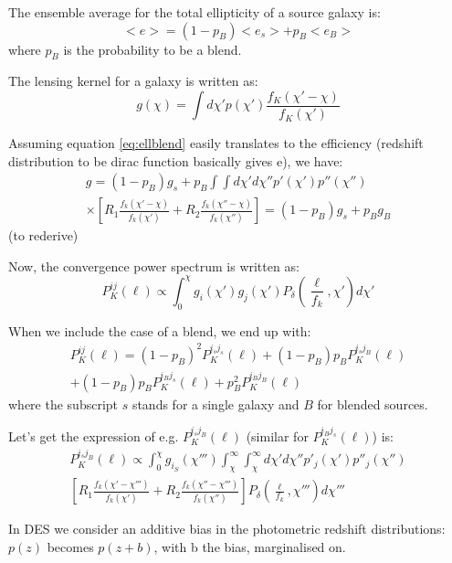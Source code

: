 \documentclass[prd,amsmath,aps,floats,amssymb, floatfix, superscriptaddress,nofootinbib,preprintnumbers,twocolumn]{article}  %
\begin{document}
The ensemble average for the total ellipticity of a source galaxy is: 
\begin{equation}
<e> = (1 - p_B) <e_s> + p_B <e_B> 
\end{equation}
where $p_B$ is the probability to be a blend. 

The lensing kernel for a galaxy is written as: 
\begin{equation}
g(\chi) = \int d\chi' p(\chi') \frac{f_K(\chi' - \chi)}{f_K(\chi')}
\end{equation}

Assuming equation \ref{eq:ellblend} easily translates to the efficiency (redshift distribution to be dirac function basically gives e), we have: 
\begin{multline}
g = (1 - p_B) g_s + p_B  \int \int d\chi' d\chi'' p'(\chi')p''(\chi'')  \\
\times [ R_1  \frac{f_k (\chi' - \chi)}{f_k (\chi')} 
+ R_2 \frac{f_k (\chi'' - \chi)}{f_k (\chi'')}   ] 
= (1 - p_B) g_s + p_B g_B
\end{multline}
(to rederive)

Now, the convergence power spectrum is written as:
\begin{equation}
P_K^{ij}(\ell) \propto \int_0^{\chi} g_i(\chi') g_j(\chi') P_{\delta} (\frac{\ell}{f_k},\chi') d\chi'
\end{equation}

When we include the case of a blend, we end up with: 
\begin{multline}
P_K^{ij}(\ell) =  (1 - p_B)^2 P_{K}^{i_s j_s}(\ell)  + (1 - p_B) p_B  P_{K}^{i_s j_B}(\ell) \\
+ (1 - p_B) p_B  P_{K}^{i_B j_s}(\ell) + p_B ^2 P_{K}^{i_B j_B}(\ell) 
\end{multline}
where the subscript $s$ stands for a single galaxy and $B$ for blended sources. 

Let's get the expression of e.g. $P_{K}^{i_s j_B}(\ell)$ (similar for $P_{K}^{i_B j_s}(\ell)$) is:
\begin{multline}
P_K^{i_sj_B}(\ell) \propto \int_0^{\chi} g_{i_S}(\chi''') \int_{\chi}^{\infty} \int_{\chi}^{\infty} d\chi' d\chi'' p'_j(\chi')p''_j(\chi'')  \\
[ R_1  \frac{f_k (\chi' - \chi''')}{f_k (\chi')} 
+ R_2 \frac{f_k (\chi'' - \chi''')}{f_k (\chi'')}   ]   P_{\delta} (\frac{\ell}{f_k},\chi''') d\chi'''
\end{multline}

In DES we consider an additive bias in the photometric redshift distributions: $p(z)$ becomes $p(z+b)$, with b the bias, marginalised on. 
\end{document}
